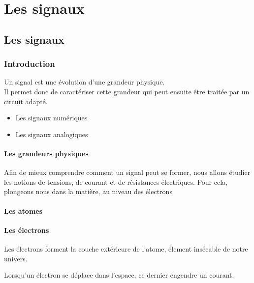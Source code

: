 \part{Les signaux}
\chapter{Les signaux}

\section{Introduction}

Un signal est une évolution d'une grandeur physique.\\
Il permet donc de caractériser cette grandeur qui peut ensuite être traitée par un circuit adapté.


\begin{itemize}
    \item Les signaux numériques
    \item Les signaux analogiques
\end{itemize} 

\subsection{Les grandeurs physiques}

Afin de mieux comprendre comment un signal peut se former, nous allons étudier les notions de tensions, de courant et de résistances électriques.
Pour cela, plongeons nous dans la matière, au niveau des électrons

\subsection{Les atomes}


\subsection{Les électrons}

Les électrons forment la couche extérieure de l'atome, élement insécable de notre univers.


Lorsqu'un électron se déplace dans l'espace, ce dernier engendre un courant.\\



